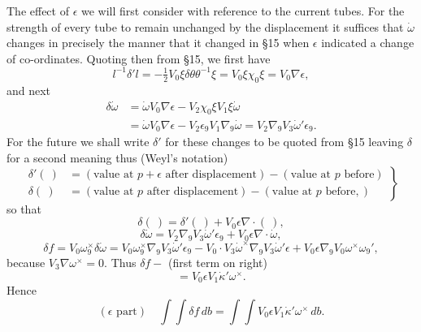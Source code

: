 \documentclass[11pt]{article}
\begin{document}
\indent The effect of $\epsilon$ we will first consider with reference to the current tubes. For the strength of every tube to remain unchanged by the displacement it suffices that $\dot\omega$ changes in precisely the manner that it changed in §15 when $\epsilon$ indicated a change of co-ordinates. Quoting then from §15, we first have
\[
  l^{-1}\delta'l=-\tfrac12V_0\xi\delta\theta\theta^{-1}\xi
  =V_0\xi\chi_0\xi=V_0\nabla\epsilon,
\]
and next
\[
  \begin{aligned}
    \delta\dot\omega&=\dot\omega V_0\nabla\epsilon-V_2\chi_0\xi V_1\xi\dot\omega\\
    &=\dot\omega V_0\nabla\epsilon-V_2\epsilon_9V_1\nabla_9\dot\omega
      =V_2\nabla_9V_3\dot\omega'\epsilon_9.
  \end{aligned}
\]
For the future we shall write $\delta'$ for these changes to be quoted from §15 leaving $\delta$ for a second meaning thus (Weyl's notation)
\begin{equation}
  \left.\begin{aligned}
    \delta'(\ )&=(\text{value at }p+\epsilon\text{ after displacement})-(\text{value at }p\text{ before})\\
    \delta(\ )&=(\text{value at }p\text{ after displacement})-(\text{value at }p\text{ before},)
  \end{aligned}\right\}
  \tag{14}
\end{equation}
so that
\[
  \delta(\ )=\delta'(\ )+V_0\epsilon\nabla\mathbin{\cdot}(\ ),
\]
\[
  \delta\dot\omega=V_2\nabla_9V_3\dot\omega'\epsilon_9+V_0\epsilon\nabla\mathbin{\cdot}\dot\omega,
\]
\[
  \delta f=V_0\omega_9^\times\delta\dot\omega
  =V_0\omega_9^\times\nabla_9V_3\dot\omega'\epsilon_9
   -V_0\mathbin{\cdot}V_3\dot\omega^\times\nabla_9V_3\dot\omega'\epsilon
   +V_0\epsilon\nabla_9V_0\omega^\times\omega_9',
\]
because $V_3\nabla\omega^\times=0$. Thus $\delta f-$ (first term on right)
\[
  =V_0\epsilon V_1\dot\kappa'\omega^\times.
\]
Hence
\begin{equation}
  (\epsilon\text{ part})\quad\int\!\int\delta f\,db
  =\int\!\int V_0\epsilon V_1\dot\kappa'\omega^\times\,db.
  \tag{15}
\end{equation}
\end{document}
